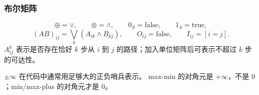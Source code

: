 \subsubsection*{布尔矩阵}
\[
  \oplus=\lor,\qquad \otimes=\land,\qquad
  0_S=\mathrm{false},\qquad1_S=\mathrm{true},
\]
\[
  (AB)_{ij}=\bigvee_k(A_{ik}\land B_{kj}),\qquad
  O_{ij}=\mathrm{false},\qquad
  I_{ij}=[i=j].
\]
$A^k_{ij}$ 表示是否存在恰好 $k$ 步从 $i$ 到 $j$ 的路径；加入单位矩阵后可表示不超过 $k$ 步的可达性。

\begin{icpcwarning}[无穷与单位阵]
  $\pm\infty$ 在代码中通常用足够大的正负哨兵表示。
  max-min 的对角元是 $+\infty$，不是 $0$；min/max-plus 的对角元才是 $0$。
\end{icpcwarning}
